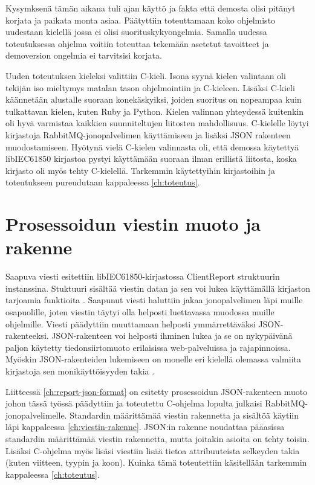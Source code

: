 Kysymksenä tämän aikana tuli ajan käyttö ja fakta että demosta olisi pitänyt korjata ja paikata monta asiaa. Päätyttiin toteuttamaan koko ohjelmisto uudestaan kielellä jossa ei olisi suorituskykyongelmia. Samalla uudessa toteutuksessa ohjelma voitiin toteuttaa tekemään asetetut tavoitteet ja demoversion ongelmia ei tarvitsisi korjata.

Uuden toteutuksen kieleksi valittiin C-kieli. Isona syynä kielen valintaan oli tekijän iso mieltymys matalan tason ohjelmointiin ja C-kieleen. Lisäksi C-kieli käännetään alustalle suoraan konekäskyiksi, joiden suoritus on nopeampaa kuin tulkattavan kielen, kuten Ruby ja Python. Kielen valinnan yhteydessä kuitenkin oli hyvä varmistaa kaikkien suunniteltujen liitosten mahdollisuus. C-kielelle löytyi kirjastoja RabbitMQ-jonopalvelimen käyttämiseen ja lisäksi JSON rakenteen muodostamiseen. Hyötynä vielä C-kielen valinnasta oli, että demossa käytettyä libIEC61850 kirjastoa pystyi käyttämään suoraan ilman erillistä liitosta, koska kirjasto oli myös tehty C-kielellä. Tarkemmin käytettyihin kirjastoihin ja toteutukseen pureudutaan kappaleessa \ref{ch:toteutus}.


\section{Prosessoidun viestin muoto ja rakenne}
Saapuva viesti esitettiin libIEC61850-kirjastossa ClientReport struktuurin instanssina. Stuktuuri sisältää viestin datan ja sen voi lukea käyttämällä kirjaston tarjoamia funktioita \mbox{\cite{libIEC61850-doc}}. Saapunut viesti haluttiin jakaa jonopalvelimen läpi muille osapuolille, joten viestin täytyi olla helposti luettavassa muodossa muille ohjelmille. Viesti päädyttiin muuttamaan helposti ymmärrettäväksi JSON-rakenteeksi. JSON-rakenteen voi helposti ihminen lukea ja se on nykypäivänä paljon käytetty tiedonsiirtomuoto erilaisissa web-palveluissa ja rajapinnoissa. Myöskin JSON-rakenteiden lukemiseen on monelle eri kielellä olemassa valmiita kirjastoja sen monikäyttöisyyden takia \mbox{\cite{Patrizio2016}}.

Liitteessä \ref{ch:report-json-format} on esitetty prosessoidun JSON-rakenteen muoto johon tässä työssä päädyttiin ja toteutettu C-ohjelma lopulta julkaisi RabbitMQ-jonopalvelimelle. Standardin määrittämää viestin rakennetta ja sisältöä käytiin läpi kappaleessa \ref{ch:viestin-rakenne}. JSON:in rakenne noudattaa pääasissa standardin määrittämää viestin rakennetta, mutta joitakin asioita on tehty toisin. Lisäksi C-ohjelma myös lisäsi viestiin lisää tietoa attribuuteista selkeyden takia (kuten viitteen, tyypin ja koon). Kuinka tämä toteutettiin käsitellään tarkemmin kappaleessa \ref{ch:toteutus}.

